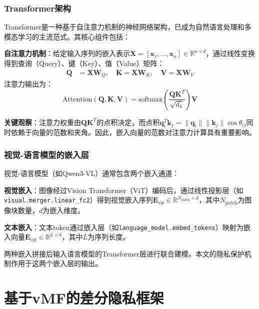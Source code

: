 \documentclass[a4paper,12pt]{article}
\begin{document}
\subsubsection{Transformer架构}

Transformer是一种基于自注意力机制的神经网络架构，已成为自然语言处理和多模态学习的主流范式。其核心组件包括：

\textbf{自注意力机制}：给定输入序列的嵌入表示$\mathbf{X} = [\mathbf{x}_1, \ldots, \mathbf{x}_n] \in \mathbb{R}^{n \times d}$，通过线性变换得到查询（Query）、键（Key）、值（Value）矩阵：
\begin{align}
\mathbf{Q} &= \mathbf{X}\mathbf{W}_Q, \quad \mathbf{K} = \mathbf{X}\mathbf{W}_K, \quad \mathbf{V} = \mathbf{X}\mathbf{W}_V
\end{align}
注意力输出为：
\begin{equation}
\text{Attention}(\mathbf{Q}, \mathbf{K}, \mathbf{V}) = \text{softmax}\left(\frac{\mathbf{Q}\mathbf{K}^T}{\sqrt{d_k}}\right)\mathbf{V}
\end{equation}

\textbf{关键观察}：注意力权重由$\mathbf{Q}\mathbf{K}^T$的点积决定，而点积$\mathbf{q}_i^T \mathbf{k}_j = \|\mathbf{q}_i\| \|\mathbf{k}_j\| \cos\theta_{ij}$同时依赖于向量的范数和夹角。因此，嵌入向量的范数对注意力计算具有重要影响。

\subsubsection{视觉-语言模型的嵌入层}

视觉-语言模型（如Qwen3-VL）通常包含两个嵌入通道：

\textbf{视觉嵌入}：图像经过Vision Transformer（ViT）编码后，通过线性投影层（如\texttt{visual.merger.linear\_fc2}）得到视觉嵌入序列$\mathbf{E}_{\text{vis}} \in \mathbb{R}^{N_{\text{patch}} \times d}$，其中$N_{\text{patch}}$为图像块数量，$d$为嵌入维度。

\textbf{文本嵌入}：文本token通过嵌入层（如\texttt{language\_model.embed\_tokens}）映射为嵌入向量$\mathbf{E}_{\text{txt}} \in \mathbb{R}^{L \times d}$，其中$L$为序列长度。

两种嵌入拼接后输入语言模型的Transformer层进行联合建模。本文的隐私保护机制作用于这两个嵌入层的输出。

\section{基于vMF的差分隐私框架}
\end{document}
